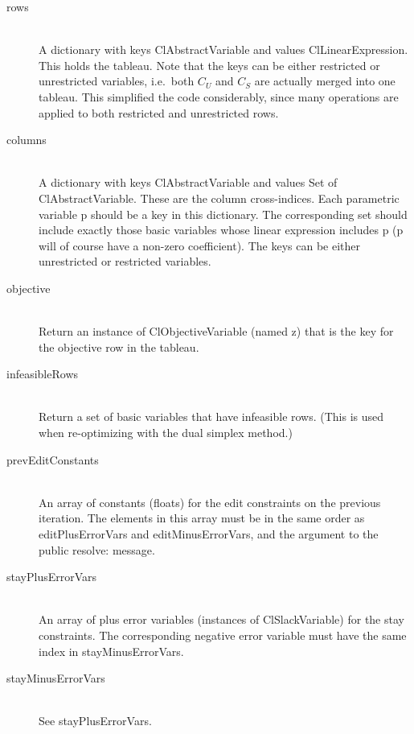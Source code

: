 \documentclass{article}
\begin{document}
\begin{description}

\item[{\sf rows}] \ \\
A dictionary with keys {\sf ClAbstractVariable} and
values {\sf ClLinearExpression}.  This holds the tableau.  Note that the
keys can be either restricted or unrestricted variables, i.e.\ both $C_U$
and $C_S$ are actually merged into one tableau.  This simplified the code
considerably, since many operations are applied to both restricted and
unrestricted rows.

\item[{\sf columns}] \ \\
A dictionary with keys {\sf ClAbstractVariable} and
values {\sf Set of ClAbstractVariable}.  These are the column
cross-indices.  Each parametric variable {\sf p} should be a key in this
dictionary.  The corresponding set should include exactly those basic
variables whose linear expression includes {\sf p}
({\sf p} will of course have a non-zero coefficient).  The keys can be 
either unrestricted or restricted variables.

\item[{\sf objective}] \ \\
Return an instance of {\sf ClObjectiveVariable}
(named {\sf z}) that is the key for the objective row in the tableau.

\item[{\sf infeasibleRows}] \ \\
Return a set of basic variables that have
infeasible rows.  (This is used when re-optimizing with the dual simplex
method.)  

\item[{\sf prevEditConstants}] \ \\
An array of constants (floats) for the edit
constraints on the previous iteration.  The elements in this array must be
in the same order as {\sf editPlusErrorVars} and {\sf editMinusErrorVars},
and the argument to the public {\sf resolve:} message.

\item[{\sf stayPlusErrorVars}] \ \\
An array of plus error variables (instances
of {\sf ClSlackVariable}) for the stay constraints.  The corresponding
negative error variable must have the same index in {\sf stayMinusErrorVars}.

\item[{\sf stayMinusErrorVars}] \ \\
See {\sf stayPlusErrorVars}.


\end{description}
\end{document}
